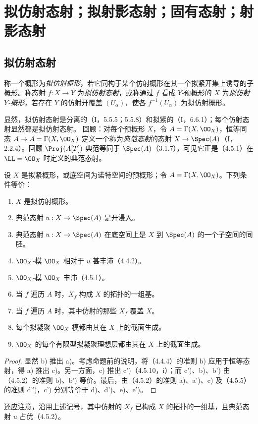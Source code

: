 \section{拟仿射态射；拟射影态射；固有态射；射影态射}
\subsection{拟仿射态射}

称一个概形为\emph{拟仿射概形}，若它同构于某个仿射概形在其一个拟紧开集上诱导的子概形。称态射 $f:X\to Y$ 为\emph{拟仿射态射}，或称通过 $f$ 看成 $Y$-预概形的 $X$ 为\emph{拟仿射 $Y$-概形}，若存在 $Y$ 的仿射开覆盖 $(U_\alpha)$，使各 $f^{-1}(U_\alpha)$ 为拟仿射概形。

显然，拟仿射态射是分离的（I，5.5.5；5.5.8）和拟紧的（I，6.6.1）；每个仿射态射显然都是拟仿射态射。
回顾：对每个预概形 $X$，令 $A=\Gamma(X,\OO_X)$，恒等同态 $A\to A=\Gamma(X,\OO_X)$ 定义一个称为\emph{典范态射}的态射 $X\to\Spec(A)$（I，2.2.4）。回顾 $\Proj(A[T])$ 典范等同于 $\Spec(A)$（3.1.7），可见它正是（4.5.1）在 $\LL=\OO_X$ 时定义的典范态射。

设 $X$ 是拟紧概形，或底空间为诺特空间的预概形；令 $A=\Gamma(X,\OO_X)$。下列条件等价：
\begin{enumerate}[label=\textup{a)}]
\item $X$ 是拟仿射概形。
\item[\textup{b)}] 典范态射 $u:X\to\Spec(A)$ 是开浸入。
\item[\textup{b')}] 典范态射 $u:X\to\Spec(A)$ 在底空间上是 $X$ 到 $\Spec(A)$ 的一个子空间的同胚。
\item[\textup{c)}] $\OO_X$-模 $\OO_X$ 相对于 $u$ 甚丰沛（4.4.2）。
\item[\textup{c')}] $\OO_X$-模 $\OO_X$ 丰沛（4.5.1）。
\item[\textup{d)}] 当 $f$ 遍历 $A$ 时，$X_f$ 构成 $X$ 的拓扑的一组基。
\item[\textup{d')}] 当 $f$ 遍历 $A$ 时，其中仿射的那些 $X_f$ 覆盖 $X$。
\item[\textup{e)}] 每个拟凝聚 $\OO_X$-模都由其在 $X$ 上的截面生成。
\item[\textup{e')}] $\OO_X$ 的每个有限型拟凝聚理想层都由其在 $X$ 上的截面生成。
\end{enumerate}
\begin{proof}
显然 b) 推出 a)。考虑命题前的说明，将（4.4.4）的准则 b) 应用于恒等态射，得 a) 推出 c)。另一方面，c) 推出 c')（4.5.10，i）；而 c')、b)、b') 由（4.5.2）的准则 b)、b') 等价。最后，由（4.5.2）的准则 a)、a')、c) 及（4.5.5）的准则 d'')，c') 分别等价于 d)、d')、e)、e')。
\end{proof}
还应注意，沿用上述记号，其中仿射的 $X_f$ 已构成 $X$ 的拓扑的一组基，且典范态射 $u$ 占优（4.5.2）。

